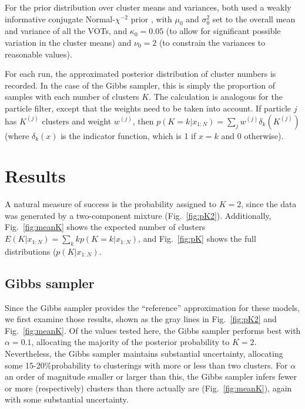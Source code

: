 \documentclass[10pt,letterpaper]{article}
\begin{document}
For the prior distribution over cluster means and variances, both used a
weakly informative conjugate Normal-\(\chi^{-2}\) prior
\autocite{Gelman2003}, with \(\mu_0\) and \(\sigma^2_0\) set to the
overall mean and variance of all the VOTs, and \(\kappa_0 = 0.05\) (to
allow for significant possible variation in the cluster means) and
\(\nu_0 = 2\) (to constrain the variances to reasonable values).

For each run, the approximated posterior distribution of cluster numbers
is recorded. In the case of the Gibbs sampler, this is simply the
proportion of samples with each number of clusters \(K\). The
calculation is analogous for the particle filter, except that the
weights need to be taken into account. If particle \(j\) has \(K^{(j)}\)
clusters and weight \(w^{(j)}\), then
\(p(K=k | x_{1:N}) = \sum_j w^{(j)} \delta_{k}(K^{(j)})\) (where
\(\delta_k(x)\) is the indicator function, which is 1 if \(x=k\) and 0
otherwise).

\hypertarget{results}{%
\section{Results}\label{results}}

A natural measure of success is the probability assigned to \(K=2\),
since the data was generated by a two-component mixture
(Fig.~\ref{fig:pK2}). Additionally, Fig.~\ref{fig:meanK} shows the
expected number of clusters
\(E(K | x_{1:N}) = \sum_k k p(K=k | x_{1:N})\), and Fig.~\ref{fig:pK}
shows the full distributions (\(p(K | x_{1:N})\).

\hypertarget{gibbs-sampler}{%
\subsection{Gibbs sampler}\label{gibbs-sampler}}

Since the Gibbs sampler provides the \enquote{reference} approximation
for these models, we first examine those results, shown as the gray
lines in Fig.~\ref{fig:pK2} and Fig.~\ref{fig:meanK}. Of the values
tested here, the Gibbs sampler performs best with \(\alpha=0.1\),
allocating the majority of the posterior probability to \(K=2\).
Nevertheless, the Gibbs sampler maintains substantial uncertainty,
allocating some 15-20\%probability to clusterings with more or less than
two clusters. For \(\alpha\) an order of magnitude smaller or larger
than this, the Gibbs sampler infers fewer or more (respectively)
clusters than there actually are (Fig.~\ref{fig:meanK}), again with some
substantial uncertainty.
\end{document}
